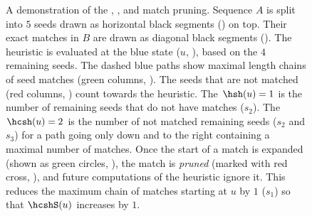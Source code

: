 \begin{figure}[H]
    \centering

    \hfill
    \hfill

    \caption[Seed heuristic, match chaining, match pruning]{A demonstration of the \sh, \csh, and match pruning. Sequence $A$
      is split into $5$ seeds drawn as horizontal black segments (\seed) on top.
      Their exact matches in $B$ are drawn as diagonal black segments (\match). The
      heuristic is evaluated at the blue state ($u$, \bluecircle), based on the $4$ remaining
      seeds. The dashed blue paths show maximal length chains of seed matches
      (green columns, \greencolumn). The seeds that are not matched (red
      columns, \redcolumn) count
      towards the heuristic.
      \protect{} The \sh $\hsh(u) = 1$ is the number of remaining
      seeds that do not have matches ($s_2$).
      \protect{} The \csh $\hcsh(u) = 2$ is the number of not
      matched remaining seeds ($s_2$ and $s_3$) for a path going only down and
      to the right containing a maximal number of matches.
      \protect{} Once the start of a match is expanded (shown
      as green circles, \greencircle), the match is \emph{pruned} (marked with
      red cross, \cross), and future computations of the heuristic ignore it.
      This reduces the maximum chain of matches starting at $u$ by $1$ ($s_1$)
      so that $\hcshS(u)$ increases by $1$. }
    \label{GLOBALfig:heuristics}
\end{figure}
